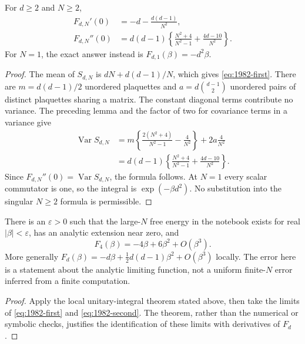\begin{proposition}
For \(d\geq2\) and \(N\geq2\),
\begin{align}
 F_{d,N}'(0)&=-d-\frac{d(d-1)}{N^2},\label{eq:1982-first}\\
 F_{d,N}''(0)&=d(d-1)\left\{
      \frac{N^2+4}{N^2-1}+\frac{4d-10}{N^2}\right\}.
       \label{eq:1982-second}
\end{align}
For \(N=1\), the exact answer instead is
\(F_{d,1}(\beta)=-d^2\beta\).
\end{proposition}
\begin{proof}
The mean of \(S_{d,N}\) is
\(dN+d(d-1)/N\), which gives \eqref{eq:1982-first}.
There are \(m=d(d-1)/2\) unordered plaquettes and
\(a=d\binom{d-1}{2}\) unordered pairs of distinct plaquettes sharing a matrix.
The constant diagonal terms contribute no variance. The preceding lemma and
the factor of two for covariance terms in a variance give
\begin{align*}
 \operatorname{Var}S_{d,N}
 &=m\left\{\frac{2(N^2+4)}{N^2-1}-\frac4{N^2}\right\}
       +2a\frac4{N^2}\\
 &=d(d-1)\left\{\frac{N^2+4}{N^2-1}+\frac{4d-10}{N^2}\right\}.
\end{align*}
Since \(F_{d,N}''(0)=\operatorname{Var}S_{d,N}\), the formula follows.
At \(N=1\) every scalar commutator is one, so the integral is
\(\exp(-\beta d^2)\). No substitution into the singular \(N\geq2\)
formula is permissible.
\end{proof}

\begin{corollary}
There is an \(\varepsilon>0\) such that the large-\(N\) free energy in
the notebook exists for real \(|\beta|<\varepsilon\), has an analytic
extension near zero, and
\[
                 F_4(\beta)=-4\beta+6\beta^2+O(\beta^3).
\]
More generally \(F_d(\beta)=-d\beta+\tfrac12d(d-1)\beta^2+O(\beta^3)\)
locally. The error here is a statement about the analytic limiting function,
not a uniform finite-\(N\) error inferred from a finite computation.
\end{corollary}
\begin{proof}
Apply the local unitary-integral theorem stated above, then take the limits
of \eqref{eq:1982-first} and \eqref{eq:1982-second}.
The theorem, rather than the numerical or symbolic checks, justifies the
identification of these limits with derivatives of \(F_d\).
\end{proof}

